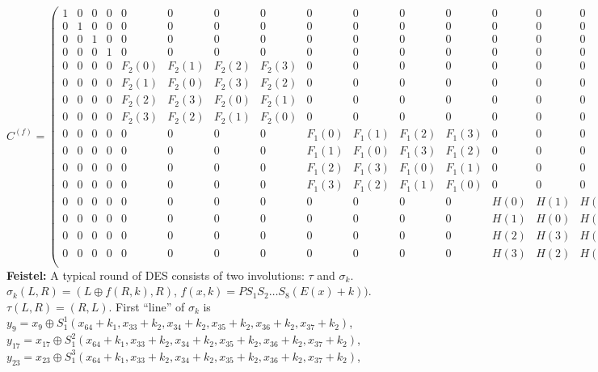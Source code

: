 $$C^{(f)}=
\left(
\begin{array}{cccc|cccc|cccc|cccc}
1 & 0 & 0 & 0 & 0 & 0 & 0 & 0 & 0 & 0 & 0 & 0 & 0 & 0 & 0 & 0 \\
0 & 1 & 0 & 0 & 0 & 0 & 0 & 0 & 0 & 0 & 0 & 0 & 0 & 0 & 0 & 0 \\
0 & 0 & 1 & 0 & 0 & 0 & 0 & 0 & 0 & 0 & 0 & 0 & 0 & 0 & 0 & 0 \\
0 & 0 & 0 & 1 & 0 & 0 & 0 & 0 & 0 & 0 & 0 & 0 & 0 & 0 & 0 & 0 \\
\hline
0 & 0 & 0 & 0 &  F_2(0) &  F_2(1) &  F_2(2) &  F_2(3) & 0 & 0 & 0 & 0 & 0 & 0 & 0 & 0 \\
0 & 0 & 0 & 0 &  F_2(1) &  F_2(0) &  F_2(3) &  F_2(2) & 0 & 0 & 0 & 0 & 0 & 0 & 0 & 0 \\
0 & 0 & 0 & 0 &  F_2(2) &  F_2(3) &  F_2(0) &  F_2(1) & 0 & 0 & 0 & 0 & 0 & 0 & 0 & 0 \\
0 & 0 & 0 & 0 &  F_2(3) &  F_2(2) &  F_2(1) &  F_2(0) & 0 & 0 & 0 & 0 & 0 & 0 & 0 & 0 \\
\hline
0 & 0 & 0 & 0 & 0 & 0 & 0 & 0 &  F_1(0) &  F_1(1) &  F_1(2) &  F_1(3) & 0 & 0 & 0 & 0 \\
0 & 0 & 0 & 0 & 0 & 0 & 0 & 0 &  F_1(1) &  F_1(0) &  F_1(3) &  F_1(2) & 0 & 0 & 0 & 0 \\
0 & 0 & 0 & 0 & 0 & 0 & 0 & 0 &  F_1(2) &  F_1(3) &  F_1(0) &  F_1(1) & 0 & 0 & 0 & 0 \\
0 & 0 & 0 & 0 & 0 & 0 & 0 & 0 &  F_1(3) &  F_1(2) &  F_1(1) &  F_1(0) & 0 & 0 & 0 & 0 \\
\hline
0 & 0 & 0 & 0 & 0 & 0 & 0 & 0 & 0 & 0 & 0 & 0 &  H(0) &  H(1) &  H(2) &  H(3) \\
0 & 0 & 0 & 0 & 0 & 0 & 0 & 0 & 0 & 0 & 0 & 0 &  H(1) &  H(0) &  H(3) &  H(2) \\
0 & 0 & 0 & 0 & 0 & 0 & 0 & 0 & 0 & 0 & 0 & 0 &  H(2) &  H(3) &  H(0) &  H(1) \\
0 & 0 & 0 & 0 & 0 & 0 & 0 & 0 & 0 & 0 & 0 & 0 &  H(3) &  H(2) &  H(1) &  H(0) \\
\end{array}
\right)$$
{\bf Feistel:}
A typical round of DES consists of two involutions: $\tau$ and $\sigma_k$.
$\sigma_k (L,R)= (L \oplus f(R,k), R)$, $f(x,k)= P S_1 S_2 \ldots S_8 (E(x)+k))$.
$\tau(L,R)= (R,L)$.
First ``line'' of $\sigma_k$ is 
$y_9= x_9 \oplus S_1^1(x_{64}+k_1,x_{33}+k_2,x_{34}+k_2, x_{35}+k_2, x_{36}+k_2, x_{37}+k_2)$,
$y_{17}= 
x_{17} \oplus S_1^2(x_{64}+k_1,x_{33}+k_2,x_{34}+k_2,x_{35}+k_2, x_{36}+k_2, x_{37}+k_2)$,
$y_{23}= 
x_{23} \oplus S_1^3(x_{64}+k_1,x_{33}+k_2,x_{34}+k_2,x_{35}+k_2, x_{36}+k_2, x_{37}+k_2)$,
